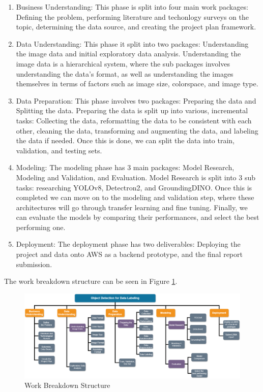 \documentclass[stu,12pt,floatsintext]{apa7}
\begin{document}
\begin{enumerate}
    \item Business Understanding: This phase is split into four main work packages: Defining the problem, performing literature and techonlogy surveys on the topic, determining the data source, and creating the project plan framework.
 
    \item Data Understanding: This phase it split into two packages: Understanding the image data and initial exploratory data analysis. Understanding the image data is a hierarchical system, where the sub packages involves understanding the data's format, as well as understanding the images themselves in terms of factors such as image size, colorspace, and image type.
    
    \item Data Preparation: This phase involves two packages: Preparing the data and Splitting the data. Preparing the data is split up into various, incremental tasks: Collecting the data, reformatting the data to be consistent with each other, cleaning the data, transforming and augmenting the data, and labeling the data if needed. Once this is done, we can split the data into train, validation, and testing sets.
    
    \item Modeling: The modeling phase has 3 main packages: Model Research, Modeling and Validation, and Evaluation. Model Research is split into 3 sub tasks: researching YOLOv8, Detectron2, and GroundingDINO. Once this is completed we can move on to the modeling and validation step, where these architectures will go through transfer learning and fine tuning. Finally, we can evaluate the models by comparing their performances, and select the best performing one.
    
    \item Deployment: The deployment phase has two deliverables: Deploying the project and data onto AWS as a backend prototype, and the final report submission. 
\end{enumerate}

The work breakdown structure can be seen in Figure \ref{fig:wbs}.
\begin{figure}[!htb]
    \centering
    \includegraphics[width=1\linewidth]{./images/WBS_updated.png}
    \caption{Work Breakdown Structure}
    \label{fig:wbs}
\end{figure}
\end{document}
